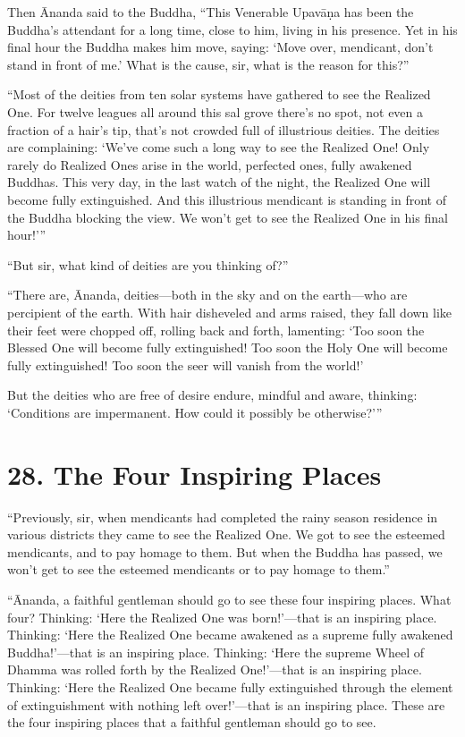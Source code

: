 \documentclass[12pt,openany]{book}%
\begin{document}
Then Ānanda said to the Buddha, “This Venerable \textsanskrit{Upavāṇa} has been the Buddha’s attendant for a long time, close to him, living in his presence. Yet in his final hour the Buddha makes him move, saying: ‘Move over, mendicant, don’t stand in front of me.’ What is the cause, sir, what is the reason for this?” 

“Most of the deities from ten solar systems have gathered to see the Realized One. For twelve leagues all around this sal grove there’s no spot, not even a fraction of a hair’s tip, that’s not crowded full of illustrious deities. The deities are complaining: ‘We’ve come such a long way to see the Realized One! Only rarely do Realized Ones arise in the world, perfected ones, fully awakened Buddhas. This very day, in the last watch of the night, the Realized One will become fully extinguished. And this illustrious mendicant is standing in front of the Buddha blocking the view. We won’t get to see the Realized One in his final hour!’” 

“But sir, what kind of deities are you thinking of?” 

“There are, Ānanda, deities—both in the sky and on the earth—who are percipient of the earth. With hair disheveled and arms raised, they fall down like their feet were chopped off, rolling back and forth, lamenting: ‘Too soon the Blessed One will become fully extinguished! Too soon the Holy One will become fully extinguished! Too soon the seer will vanish from the world!’ 

But the deities who are free of desire endure, mindful and aware, thinking: ‘Conditions are impermanent. How could it possibly be otherwise?’” 

\section*{28. The Four Inspiring Places }

“Previously, sir, when mendicants had completed the rainy season residence in various districts they came to see the Realized One. We got to see the esteemed mendicants, and to pay homage to them. But when the Buddha has passed, we won’t get to see the esteemed mendicants or to pay homage to them.” 

“Ānanda, a faithful gentleman should go to see these four inspiring places. What four? Thinking: ‘Here the Realized One was born!’—that is an inspiring place. Thinking: ‘Here the Realized One became awakened as a supreme fully awakened Buddha!’—that is an inspiring place. Thinking: ‘Here the supreme Wheel of Dhamma was rolled forth by the Realized One!’—that is an inspiring place. Thinking: ‘Here the Realized One became fully extinguished through the element of extinguishment with nothing left over!’—that is an inspiring place. These are the four inspiring places that a faithful gentleman should go to see. 
\end{document}

